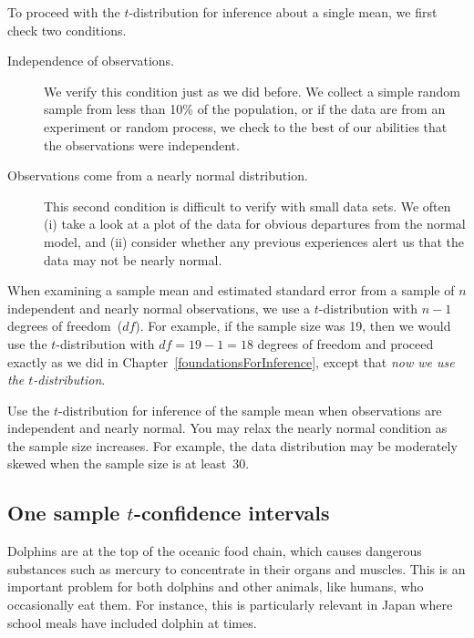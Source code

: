 To proceed with the $t$-distribution for inference about a single mean, we first check two conditions.
\begin{description}
\item[Independence of observations.] We verify this condition just as we did before. We collect a simple random sample from less than 10\% of the population, or if the data are from an experiment or random process, we check to the best of our abilities that the observations were independent.
\item[Observations come from a nearly normal distribution.] This second condition is difficult to verify with small data sets. We often (i) take a look at a plot of the data for obvious departures from the normal model, and (ii) consider whether any previous experiences alert us that the data may not be nearly normal.
\end{description}
When examining a sample mean and estimated standard error from a sample of $n$ independent and nearly normal observations, we use a $t$-distribution with $n-1$ degrees of freedom~($df$). For example, if the sample size was 19, then we would use the $t$-distribution with $df=19-1=18$ degrees of freedom and proceed exactly as we did in Chapter~\ref{foundationsForInference}, except that \emph{now we use the $t$-distribution}.

\begin{tipBox}{
Use the $t$-distribution for inference of the sample mean when observations are independent and nearly normal. You may relax the nearly normal condition as the sample size increases. For example, the data distribution may be moderately skewed when the sample size is at least~30.}
\end{tipBox}


\subsection{One sample $t$-confidence intervals}
\label{oneSampleTConfidenceIntervals}


Dolphins are at the top of the oceanic food chain, which causes dangerous substances such as mercury to concentrate in their organs and muscles. This is an important problem for both dolphins and other animals, like humans, who occasionally eat them. For instance, this is particularly relevant in Japan where school meals have included dolphin at times.
\setlength{\captionwidth}{86mm}

